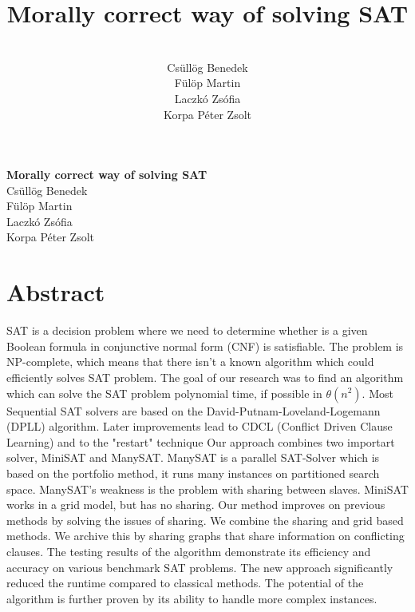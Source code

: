 \documentclass{article}
\begin{document}
\begin{titlepage}
    \centering
    \vspace{.7\baselineskip}
    {\huge \textbf{Morally correct way of solving SAT}}
    \\[10em]
      Csüllög Benedek
    \\Fülöp Martin
    \\Laczkó Zsófia
    \\Korpa Péter Zsolt\\
\end{titlepage}


\title{Morally correct way of solving SAT}
\author{
  \\Csüllög Benedek
  \\Fülöp Martin
  \\Laczkó Zsófia
  \\Korpa Péter Zsolt\\
}
\maketitle

\section*{Abstract}

SAT is a decision problem where we need to determine whether is a given Boolean formula in conjunctive normal form (CNF) is satisfiable. The problem is NP-complete, which means that there isn’t a known algorithm which could efficiently solves SAT problem. 
The goal of our research was to find an algorithm which can solve the SAT problem polynomial time, if possible in $\theta(n^2)$.
Most Sequential SAT solvers are based on the David-Putnam-Loveland-Logemann (DPLL) algorithm. Later improvements lead to CDCL (Conflict Driven Clause Learning) and to the "restart" technique Our approach combines two importart solver, MiniSAT and ManySAT. 
ManySAT is a parallel SAT-Solver which is based on the portfolio method, it runs many instances on partitioned search space. ManySAT's weakness is the problem with sharing between slaves. MiniSAT works in a grid model, but has no sharing. Our method improves on previous methods by solving the issues of sharing. We combine the sharing and grid based methods. We archive this by sharing graphs that share information on conflicting clauses. The testing results of the algorithm demonstrate its efficiency and accuracy on various benchmark SAT problems. The new approach significantly reduced the runtime compared to classical methods. The potential of the algorithm is further proven by its ability to handle more complex instances.
\end{document}
